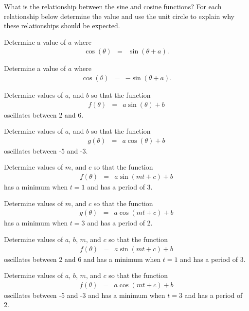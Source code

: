 \begin{problem}
\item What is the relationship between the sine and cosine functions?
  For each relationship below determine the value and use the unit
  circle to explain why these relationships should be expected.
  \begin{subproblem}
  \item Determine a value of $a$ where
    \begin{eqnarray*}
      \cos(\theta) & = & \sin(\theta+a).
    \end{eqnarray*}
    \vfill
  \item Determine a value of $a$ where
    \begin{eqnarray*}
      \cos(\theta) & = & -\sin(\theta+a).
    \end{eqnarray*}
    \vfill
  \end{subproblem}
    \clearpage

  \item Determine values of $a$, and $b$ so that the function
    \begin{eqnarray*}
      f(\theta) & = & a\sin(\theta)+b
    \end{eqnarray*}
    oscillates between 2 and 6.
    \vfill

  \item Determine values of $a$, and $b$ so that the function
    \begin{eqnarray*}
      g(\theta) & = & a\cos(\theta)+b
    \end{eqnarray*}
    oscillates between -5 and -3.
    \vfill

\clearpage

\item Determine values of $m$, and $c$ so that the function
  \begin{eqnarray*}
    f(\theta) & = & a\sin(mt+c)+b
  \end{eqnarray*}
  has a minimum when $t=1$ and has a period of 3.
  \vfill

\item Determine values of $m$, and $c$ so that the function
  \begin{eqnarray*}
    g(\theta) & = & a\cos(mt+c)+b
  \end{eqnarray*}
  has a minimum when $t=3$ and has a period of 2.
  \vfill

\clearpage

\item Determine values of $a$, $b$, $m$, and $c$ so that the function
  \begin{eqnarray*}
    f(\theta) & = & a\sin(mt+c)+b
  \end{eqnarray*}
  oscillates between 2 and 6 and has a minimum when $t=1$ and has a period of 3.
  \vfill

\item Determine values of $a$, $b$, $m$, and $c$ so that the function
  \begin{eqnarray*}
    f(\theta) & = & a\cos(mt+c)+b
  \end{eqnarray*}
  oscillates between -5 and -3 and has a minimum when $t=3$ and has a period of 2.
  \vfill

\end{problem}

